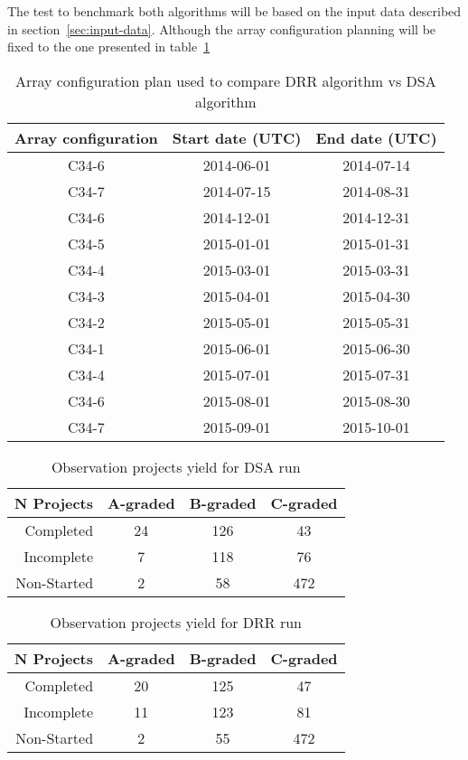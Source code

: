 The test to benchmark both algorithms will be based on the input data described in section~\ref{sec:input-data}. Although the array configuration planning will be fixed to the one presented in table~\ref{table:drr-test-array-config}
\begin{table}[h!]
\begin{center}
\begin{tabular}{|c|c|c|}
\hline
Array configuration & Start date (UTC) & End date (UTC) \\ \hline
C34-6 & 2014-06-01 & 2014-07-14 \\ \hline
C34-7 & 2014-07-15 & 2014-08-31 \\ \hline
C34-6 & 2014-12-01 & 2014-12-31 \\ \hline
C34-5 & 2015-01-01 & 2015-01-31 \\ \hline
C34-4 & 2015-03-01 & 2015-03-31 \\ \hline
C34-3 & 2015-04-01 & 2015-04-30 \\ \hline
C34-2 & 2015-05-01 & 2015-05-31 \\ \hline
C34-1 & 2015-06-01 & 2015-06-30 \\ \hline
C34-4 & 2015-07-01 & 2015-07-31 \\ \hline
C34-6 & 2015-08-01 & 2015-08-30 \\ \hline
C34-7 & 2015-09-01 & 2015-10-01 \\ \hline
\end{tabular}
\end{center}
\caption{Array configuration plan used to compare DRR algorithm vs DSA algorithm}
\label{table:drr-test-array-config}
\end{table}

\begin{table}[h!]
\centering
\begin{tabular}{|r|c|c|c|} \hline
 N Projects & A-graded & B-graded & C-graded \\ \hline
 Completed & 24 & 126 & 43 \\ \hline
 Incomplete & 7 & 118 & 76 \\ \hline
 Non-Started & 2 & 58 & 472 \\ \hline
\end{tabular}
\caption{Observation projects yield for DSA run}
\label{table:dsa-run-summary}
\end{table}

\begin{table}[h!]
\centering
\begin{tabular}{|r|c|c|c|} \hline
 N Projects & A-graded & B-graded & C-graded \\ \hline
 Completed & 20 & 125 & 47 \\ \hline
 Incomplete & 11 & 123 & 81 \\ \hline
 Non-Started & 2 & 55 & 472 \\ \hline
\end{tabular}
\caption{Observation projects yield for DRR run}
\label{table:drr-run-summary}
\end{table}

